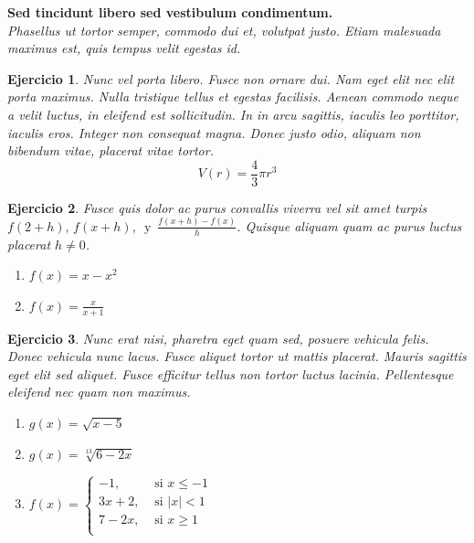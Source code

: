 \documentclass[12pt,tikz,border=5pt]{article}
\newtheorem{ejercicio}{Ejercicio}[section]
\begin{document}
\textbf{Sed tincidunt libero sed vestibulum condimentum.} \\
\textit{Phasellus ut tortor semper, commodo dui et, volutpat justo. Etiam malesuada maximus est, quis tempus velit egestas id.}


\begin{ejercicio}
  Nunc vel porta libero. Fusce non ornare dui. Nam eget elit nec elit porta maximus. Nulla tristique tellus et egestas facilisis. Aenean commodo neque a velit luctus, in eleifend est sollicitudin. In in arcu sagittis, iaculis leo porttitor, iaculis eros. Integer non consequat magna. Donec justo odio, aliquam non bibendum vitae, placerat vitae tortor. $$V(r) = \frac{4}{3} \pi r^{3}$$
\end{ejercicio}

\begin{ejercicio}
  Fusce quis dolor ac purus convallis viverra vel sit amet turpis $f(2+h), \, f(x+h), \, \text{ y } \, \frac{f(x+h)-f(x)}{h}$. Quisque aliquam quam ac purus luctus placerat $h\neq0$. 
  \begin{enumerate}[label=(\alph*)]
    \item $f(x) = x - x^{2}$
    \item $f(x) = \frac{x}{x+1}$
  \end{enumerate}
\end{ejercicio}

\begin{ejercicio}
  Nunc erat nisi, pharetra eget quam sed, posuere vehicula felis. Donec vehicula nunc lacus. Fusce aliquet tortor ut mattis placerat. Mauris sagittis eget elit sed aliquet. Fusce efficitur tellus non tortor luctus lacinia. Pellentesque eleifend nec quam non maximus.
  \begin{enumerate}[label=(\alph*)]
    \item $g(x) = \sqrt{x - 5}$
    \item $g(x) = \sqrt[13]{6 - 2x}$
    \item $f(x) = 
      \begin{cases}
        -1, &\text{ si } x \leq -1\\
        3x + 2, &\text{ si } |x| < 1\\
        7 - 2x, &\text{ si } x \geq 1\\
      \end{cases}$
  \end{enumerate}
\end{ejercicio}
\end{document}
